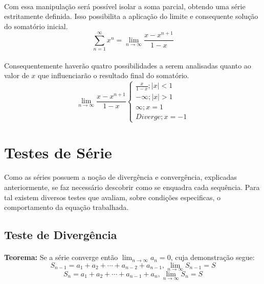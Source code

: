 \documentclass{article}
\begin{document}
            \paragraph{}Com essa manipulação será possível isolar a soma parcial, obtendo uma série estritamente definida. Isso possibilita a aplicação do limite e consequente solução do somatório inicial.
                \begin{equation}
                    \sum\limits_{n=1}^{\infty} x^n = \lim\limits_{n\to\infty}\frac{x-x^{n+1}}{1-x}
                \end{equation}
            \paragraph{}Consequentemente haverão quatro possibilidades a serem analisadas quanto ao valor de $x$ que influenciarão o resultado final do somatório.
                \begin{equation}
                    \lim\limits_{n\to\infty}\frac{x-x^{n+1}}{1-x}\left \{ \begin{matrix} \frac{x}{1-x}; |x|<1\\ -\infty; |x|>1\\ \infty; x=1\\ Diverge; x=-1\end{matrix}\right.
                \end{equation}
            
    \section{Testes de Série}
        \paragraph{}Como as séries possuem a noção de divergência e convergência, explicadas anteriormente, se faz necessário descobrir como se enquadra cada sequência. Para tal existem diversos testes que avaliam, sobre condições especificas, o comportamento da equação trabalhada.
        
        \subsection{Teste de Divergência}
            \paragraph{}\textbf{Teorema:} Se a série converge então $\lim_{n\to\infty}a_{n} = 0$, cuja demonstração segue:
                \begin{equation}
                    S_{n-1}=a_{1}+a_{2}+\cdots+a_{n-2}+a_{n-1}, \lim_{n\to\infty}S_{n-1} = S
                \end{equation}
                \begin{equation}
                    S_{n}=a_{1}+a_{2}+\cdots+a_{n-1}+a_{n}, \lim_{n\to\infty}S_{n} = S
                \end{equation}
\end{document}
